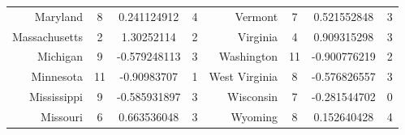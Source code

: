\documentclass[12pt]{article}
\begin{document}
\begin{table}[!h]
\begin{tabular}{|r|ccc|r|ccc|}
		Maryland	&	8	&	0.241124912	&	4	&	Vermont	&	7	&	0.521552848	&	3	\\	
		Massachusetts	&	2	&	1.30252114	&	2	&	Virginia	&	4	&	0.909315298	&	3	\\	
		Michigan	&	9	&	-0.579248113	&	3	&	Washington	&	11	&	-0.900776219	&	2	\\	
		Minnesota	&	11	&	-0.90983707	&	1	&	West Virginia	&	8	&	-0.576826557	&	3	\\	
		Mississippi	&	9	&	-0.585931897	&	3	&	Wisconsin	&	7	&	-0.281544702	&	0	\\	
		Missouri	&	6	&	0.663536048	&	3	&	Wyoming	&	8	&	0.152640428	&	4	\\	\hline
	\end{tabular}
\end{table}	
\end{document}
